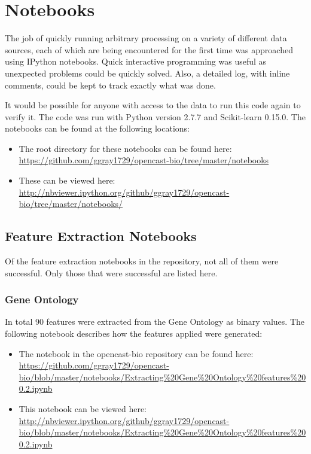\chapter{Notebooks}
\label{app:notebooks}

The job of quickly running arbitrary processing on a variety of different data sources, each of which are being encountered for the first time was approached using IPython notebooks.
Quick interactive programming was useful as unexpected problems could be quickly solved.
Also, a detailed log, with inline comments, could be kept to track exactly what was done.

It would be possible for anyone with access to the data to run this code again to verify it.
The code was run with Python version 2.7.7 and Scikit-learn 0.15.0.
The notebooks can be found at the following locations:

\begin{itemize}
    \item The root directory for these notebooks can be found here: \url{https://github.com/ggray1729/opencast-bio/tree/master/notebooks}
    \item These can be viewed here: \url{http://nbviewer.ipython.org/github/ggray1729/opencast-bio/tree/master/notebooks/}
\end{itemize}

\section{Feature Extraction Notebooks}

Of the feature extraction notebooks in the repository, not all of them were successful.
Only those that were successful are listed here.

\subsection{Gene Ontology}
\label{app:gonotes}

In total 90 features were extracted from the Gene Ontology as binary values.
The following notebook describes how the features applied were generated:

\begin{itemize}
    \item The notebook in the opencast-bio repository can be found here: \url{https://github.com/ggray1729/opencast-bio/blob/master/notebooks/Extracting%20Gene%20Ontology%20features%200.2.ipynb}
        \item This notebook can be viewed here: \url{http://nbviewer.ipython.org/github/ggray1729/opencast-bio/blob/master/notebooks/Extracting%20Gene%20Ontology%20features%200.2.ipynb}
\end{itemize}

